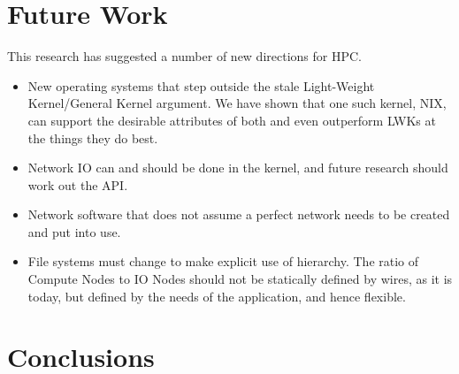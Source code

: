 \documentclass{report}
\begin{document}
\chapter{Future Work}
This research has suggested a number of new directions for HPC. 
\begin{itemize}
\item New operating systems that step outside the stale Light-Weight Kernel/General Kernel
argument. We have shown that one such kernel, NIX, can support the desirable attributes of both
and even outperform LWKs at the things they do best. 
\item Network IO can and should be done in the kernel, and future research should 
work out the API.
\item Network software that does not assume a perfect network needs to be created and put into use. 
\item File systems must change to make explicit use of hierarchy. The ratio of Compute Nodes to IO Nodes should not be 
statically defined by wires, as it is today, but defined by the needs of the application, and hence flexible. 
\end{itemize}

\chapter{Conclusions}
\end{document}
